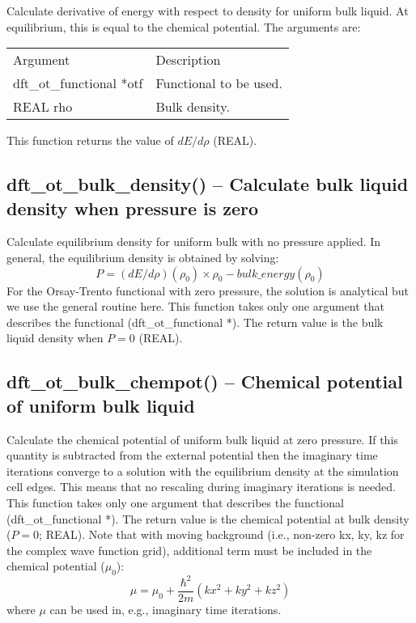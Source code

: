 \documentclass[12pt,letterpaper]{report}
\begin{document}
Calculate derivative of energy with respect to density for uniform bulk liquid. At equilibrium, this is equal to the chemical potential. The arguments are:
\begin{longtable}{p{} p{}}
Argument & Description\\
\cline{1-2}
dft\_ot\_functional *otf & Functional to be used.\\
REAL rho & Bulk density.\\
\end{longtable}
This function returns the value of $dE/d\rho$ (REAL).

\subsection{dft\_ot\_bulk\_density() -- Calculate bulk liquid density when pressure is zero}

Calculate equilibrium density for uniform bulk with no pressure applied. In general, the equilibrium density is obtained by solving:\\
$$ P = (dE/d\rho)(\rho_0)\times \rho_0 - bulk\_energy(\rho_0)$$
For the Orsay-Trento functional with zero pressure, the solution is analytical but we use the general routine here. This function takes only one argument that describes the functional (dft\_ot\_functional *). The return value is the bulk liquid density when $P = 0$ (REAL).

\subsection{dft\_ot\_bulk\_chempot() -- Chemical potential of uniform bulk liquid}

Calculate the chemical potential of uniform bulk liquid at zero pressure. If this quantity is subtracted from the external potential then the imaginary time iterations converge to a solution with the equilibrium density at the simulation cell edges. This means that no rescaling during imaginary iterations is needed. This function takes only one argument that describes the functional (dft\_ot\_functional *). The return value is the chemical potential at bulk density ($P = 0$; REAL). Note that with moving background (i.e., non-zero kx, ky, kz for the complex wave function grid), additional term must be included in the chemical potential ($\mu_0$):
$$\mu = \mu_0 + \frac{\hbar^2}{2m}\left(kx^2 + ky^2 + kz^2\right)$$
where $\mu$ can be used in, e.g., imaginary time iterations.
\end{document}
